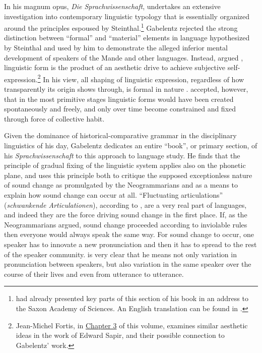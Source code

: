 \documentclass[output=paper]{langscibook}
\begin{document}
In his magnum opus, \emph{Die Sprachwissenschaft}, \citet[341--384]{Gabelentz20161891} undertakes an extensive investigation into contemporary linguistic typology that is essentially organized around the principles espoused by Steinthal.\footnote{\citet{Gabelentz1889} had already presented key parts of this section of his book in an address to the Saxon Academy of Sciences. An English translation can be found in \citet{McElvenny2019}.} Gabelentz rejected the strong distinction between ``formal'' and ``material'' elements in language hypothesized by Steinthal and used by him to demonstrate the alleged inferior mental development of speakers of the Mande and other languages. Instead, argued \citet[380--384]{Gabelentz20161891}, linguistic form is the product of an aesthetic drive to achieve subjective self-expression.\footnote{Jean-Michel Fortis, in \hyperref[chap:fortis]{Chapter 3} of this volume, examines similar aesthetic ideas in the work of Edward Sapir, and their possible connection to Gabelentz' work.} In his view, all shaping of linguistic expression, regardless of how transparently its origin shows through, is formal in nature \citep[see][]{McElvenny2016}. \citet[406--408]{Gabelentz20161891} accepted, however, that in the most primitive stages linguistic forms would have been created spontaneously and freely, and only over time become constrained and fixed through force of collective habit.

Given the dominance of historical-comparative grammar in the disciplinary linguistics of his day, Gabelentz dedicates an entire ``book'', or primary section, of his \emph{Sprachwissenschaft} to this approach to language study. He finds that the principle of gradual fixing of the linguistic system applies also on the phonetic plane, and uses this principle both to critique the supposed exceptionless nature of sound change as promulgated by the Neogrammarians and as a means to explain how sound change can occur at all. ``Fluctuating articulations'' (\emph{schwankende Articulationen}), according to \citet[196]{Gabelentz20161891}, are a very real part of languages, and indeed they are the force driving sound change in the first place. If, as the Neogrammarians argued, sound change proceeded according to inviolable rules then everyone would always speak the same way. For sound change to occur, one speaker has to innovate a new pronunciation and then it has to spread to the rest of the speaker community. \citet[196--197]{Gabelentz20161891} is very clear that he means not only variation in pronunciation between speakers, but also variation in the same speaker over the course of their lives and even from utterance to utterance.
\end{document}
